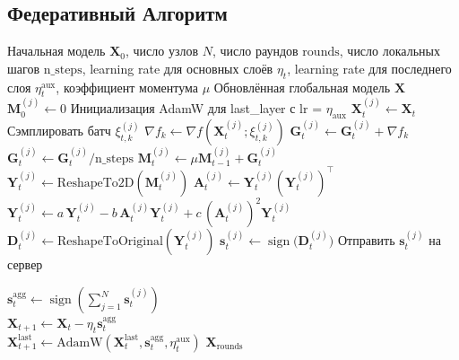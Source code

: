 \documentclass{article}
\begin{document}
\subsection{Федеративный Алгоритм}\label{app:fed_alg}
\begin{algorithm}[H]
\caption{Federated SignMuon}
\begin{algorithmic}[1]
\Require Начальная модель $\mathbf{X}_0$, число узлов $N$, число раундов $\mathrm{rounds}$, число локальных шагов $\mathrm{n\_steps}$, learning rate для основных слоёв $\eta_t$, learning rate для последнего слоя $\eta_t^{\text{aux}}$, коэффициент моментума $\mu$
\Ensure Обновлённая глобальная модель $\mathbf{X}$
 \State $\mathbf{M}_0^{(j)} \gets 0$ 
\EndFor
\State Инициализация AdamW для last\_layer с lr = $\eta_{\mathrm{aux}}$
        \State $\mathbf{X}_t^{(j)} \gets \mathbf{X}_t$ 
            \State Сэмплировать батч $\xi_{t,k}^{(j)}$
            \State $\nabla f_k \gets \nabla f(\mathbf{X}_t^{(j)}; \xi_{t,k}^{(j)})$
            \State $\mathbf{G}_t^{(j)} \gets \mathbf{G}_t^{(j)} + \nabla f_k$
        \EndFor
        \\ \State $\mathbf{G}_t^{(j)} \gets \mathbf{G}_t^{(j)} / \mathrm{n\_steps}$ 
        \State $\mathbf{M}_t^{(j)} \gets \mu \mathbf{M}_{t-1}^{(j)} + \mathbf{G}_t^{(j)}$ 
        \State $\mathbf{Y}_t^{(j)} \gets \text{ReshapeTo2D}(\mathbf{M}_t^{(j)})$ 
         
            \State $\mathbf{A}_t^{(j)} \gets \mathbf{Y}_t^{(j)} (\mathbf{Y}_t^{(j)})^\top$
            \State $\mathbf{Y}_t^{(j)} \gets a\,\mathbf{Y}_t^{(j)} - b\,\mathbf{A}_t^{(j)}\mathbf{Y}_t^{(j)} + c\,(\mathbf{A}_t^{(j)})^2\mathbf{Y}_t^{(j)}$
        \EndFor
        \State $\mathbf{D}_t^{(j)} \gets \text{ReshapeToOriginal}(\mathbf{Y}_t^{(j)})$ 
        \State $\mathbf{s}_t^{(j)} \gets \operatorname{sign}\bigl(\mathbf{D}_t^{(j)}\bigr)$ 
        \State Отправить $\mathbf{s}_t^{(j)}$ на сервер
    \EndFor
    
    \State $\mathbf{s}_t^{\mathrm{agg}} \gets \operatorname{sign}\!\left(\sum_{j=1}^{N} \mathbf{s}_t^{(j)}\right)$ 
    \\
    \State $\mathbf{X}_{t+1} \gets \mathbf{X}_t - \eta_t \mathbf{s}_t^{\mathrm{agg}}$ 
    \\
    \State $\mathbf{X}_{t+1}^{\text{last}} \gets \text{AdamW}(\mathbf{X}_t^{\text{last}}, \mathbf{s}_t^{\mathrm{agg}}, \eta_t^{\text{aux}})$ 
\EndFor
\State \Return $\mathbf{X}_{\mathrm{rounds}}$
\label{fed_alg}
\end{algorithmic}
\end{algorithm}
\end{document}
